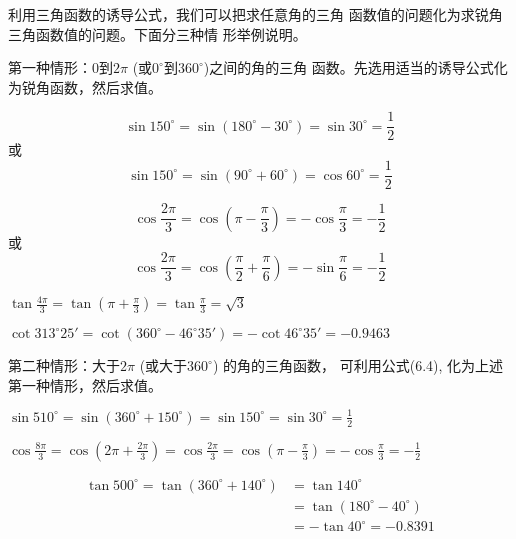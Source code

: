利用三角函数的诱导公式，我们可以把求任意角的三角
函数值的问题化为求锐角三角函数值的问题。下面分三种情
形举例说明。

第一种情形：0到$2\pi$ (或$0^{\circ}$到$360^{\circ}$)之间的角的三角
函数。先选用适当的诱导公式化为锐角函数，然后求值。

\begin{example}
\[\sin 150^{\circ}=\sin(180^{\circ}-30^{\circ})=\sin30^{\circ}=\frac{1}{2}\]
或
  \[\sin 150^{\circ}=\sin(90^{\circ}+60^{\circ})=\cos60^{\circ}=\frac{1}{2}\]  
\end{example}

\begin{example}
\[\cos\frac{2\pi}{3}=\cos\left(\pi-\frac{\pi}{3}\right)=-\cos\frac{\pi}{3}=-\frac{1}{2}\]
或
\[\cos\frac{2\pi}{3}=\cos\left(\frac{\pi}{2}+\frac{\pi}{6}\right)=-\sin\frac{\pi}{6}=-\frac{1}{2}\]
\end{example}

\begin{example}
    $\tan\frac{4\pi}{3}=\tan\left(\pi+\frac{\pi}{3}\right)=\tan\frac{\pi}{3}=\sqrt{3}$
\end{example}

\begin{example}
$\cot313^{\circ}25'=\cot(360^{\circ}-46^{\circ}35')=-\cot46^{\circ}35'=-0.9463$
\end{example}

第二种情形：大于$2\pi$ (或大于$360^{\circ}$) 的角的三角函数，
可利用公式(6.4), 化为上述第一种情形，然后求值。

\begin{example}
    $\sin 510^{\circ}=\sin(360^{\circ}+150^{\circ})=\sin150^{\circ}=\sin30^{\circ}=\frac{1}{2}$
\end{example}


\begin{example}
    $\cos\frac{8\pi}{3}=\cos\left(2\pi+\frac{2\pi}{3}\right)=\cos\frac{2\pi}{3}=\cos\left(\pi-\frac{\pi}{3}\right)=-\cos\frac{\pi}{3}=-\frac{1}{2}$
\end{example}

\begin{example}
\[\begin{split}
    \tan500^{\circ}=\tan(360^{\circ}+140^{\circ})&=\tan 140^{\circ}\\
    &=\tan(180^{\circ}-40^{\circ})\\ &=-\tan40^{\circ}=-0.8391
\end{split}\]
\end{example}

